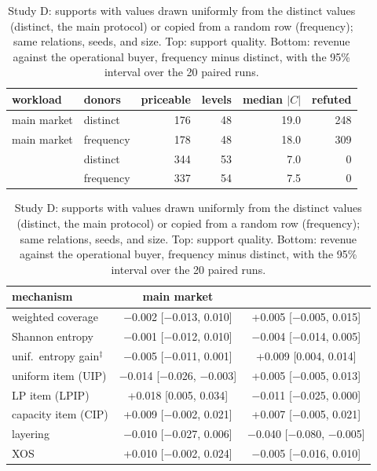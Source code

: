 
\begin{table}[tbp]
  \centering
  \footnotesize
  \setlength{\tabcolsep}{3pt}
  \caption{Study D: \qirana{} supports with values drawn uniformly from the distinct values (distinct, the main protocol) or copied from a random row (frequency); same relations, seeds, and size. Top: support quality. Bottom: revenue against the operational buyer, frequency minus distinct, with the 95\% interval over the 20 paired runs.}
  \label{tab:app-studyD}
  \begin{tabular}{@{}llrrrr@{}}
    \toprule
    workload & donors & priceable & levels & median $|C|$ & refuted \\
    \midrule
    main market & distinct & 176 & 48 & 19.0 & 248 \\
    main market & frequency & 178 & 48 & 18.0 & 309 \\
    \tpch{} & distinct & 344 & 53 & 7.0 & 0 \\
    \tpch{} & frequency & 337 & 54 & 7.5 & 0 \\
    \bottomrule
  \end{tabular}

  \medskip
  \begin{tabular}{@{}lcc@{}}
    \toprule
    mechanism & main market & \tpch{} \\
    \midrule
    \qirana{} weighted coverage & $-$0.002 [$-$0.013, 0.010] & +0.005 [$-$0.005, 0.015] \\
    \qirana{} Shannon entropy & $-$0.001 [$-$0.012, 0.010] & $-$0.004 [$-$0.014, 0.005] \\
    \qirana{} unif.\ entropy gain$^{\ddagger}$ & $-$0.005 [$-$0.011, 0.001] & +0.009 [0.004, 0.014] \\
    uniform item (UIP) & $-$0.014 [$-$0.026, $-$0.003] & +0.005 [$-$0.005, 0.013] \\
    LP item (LPIP) & +0.018 [0.005, 0.034] & $-$0.011 [$-$0.025, 0.000] \\
    capacity item (CIP) & +0.009 [$-$0.002, 0.021] & +0.007 [$-$0.005, 0.021] \\
    layering & $-$0.010 [$-$0.027, 0.006] & $-$0.040 [$-$0.080, $-$0.005] \\
    XOS & +0.010 [$-$0.002, 0.024] & $-$0.005 [$-$0.016, 0.010] \\
    \bottomrule
  \end{tabular}
\end{table}
